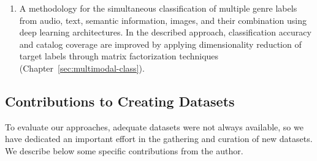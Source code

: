 \begin{enumerate}

\item 
A methodology for the simultaneous classification of multiple genre labels from audio, text, semantic information, images, and their combination using deep learning architectures. In the described approach, classification accuracy and catalog coverage are improved by applying dimensionality reduction of target labels through matrix factorization techniques (Chapter~\ref{sec:multimodal-class}). %

\end{enumerate}

\subsection{Contributions to Creating Datasets}

To evaluate our approaches, adequate datasets were not always available, so we have dedicated an important effort in the gathering and curation of new datasets. We describe below some specific contributions from the author. 

